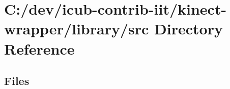\section{C\+:/dev/icub-\/contrib-\/iit/kinect-\/wrapper/library/src Directory Reference}
\label{dir_255fa8f554e95a439f260058328638ab}
\subsection*{Files}
\begin{DoxyCompactItemize}
\end{DoxyCompactItemize}
